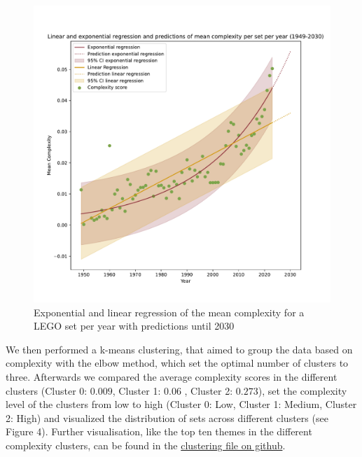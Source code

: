 \documentclass{article}
\theoremstyle{plain}
\theoremstyle{definition}
\theoremstyle{remark}
\begin{document}
\begin{figure}[ht]
 \vskip 0.2in
 \begin{center}
 \centerline{\includegraphics[width=\columnwidth]{../Images/Regressions.pdf}}
\caption{Exponential and linear regression of the mean complexity for a LEGO set per year with predictions until 2030}
\label{icml-historical}
 \end{center}
 \vskip -0.2in
\end{figure}

We then performed a k-means clustering, that aimed to group the data based on complexity with the elbow method, which set the optimal number of clusters to three. Afterwards we compared the average complexity scores in the different clusters (Cluster 0: $0.009$, Cluster 1: $0.06$ , Cluster 2: $0.273$), set the complexity level of the clusters from low to high (Cluster 0: Low, Cluster 1: Medium, Cluster 2: High) and visualized the distribution of sets across different clusters (see Figure 4). Further visualisation, like the top ten themes in the different complexity clusters, can be found in the \href{https://github.com/eddiebeach99/Data_Literacy/blob/main/Analysis/clustering.ipynb}{clustering file on github}.
\end{document}
